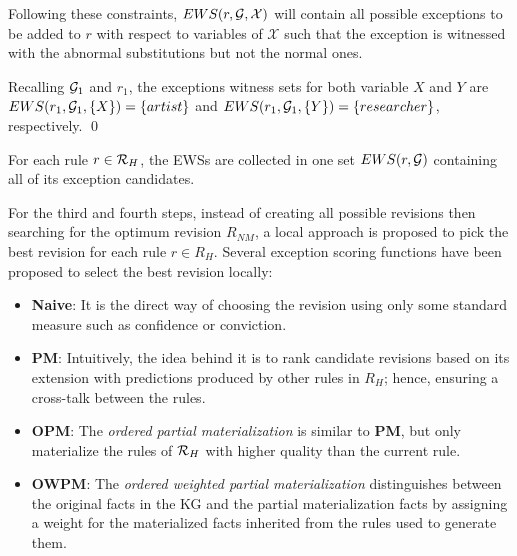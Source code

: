 Following these constraints, $EWS(r,\mathcal{G},\mathcal{X})$ will contain all possible exceptions to be added to $r$ with respect to variables of $\mathcal{X}$ such that the exception is witnessed with the abnormal substitutions but not the normal ones.


\begin{example}
Recalling $\mathcal{G}_1$ and $r_1$, the exceptions witness sets for both variable $X$ and $Y$ are $EWS(r_1,\mathcal{G}_1,\{X\}) = \{artist\}$ and $EWS(r_1,\mathcal{G}_1,\{Y\}) = \{researcher\}$, respectively.
\qed
\end{example}
For each rule $r \in \mathcal{R}_H$, the EWSs are collected in one set $EWS(r,\mathcal{G})$ containing all of its exception candidates. 

For the third and fourth steps, instead of creating all possible revisions then searching for the optimum revision $R_{NM}$, a local approach is proposed to pick the best revision for each rule $r \in R_H$. Several exception scoring functions have been proposed to select the best revision locally:
\begin{itemize}
\item \textbf{Naive}: It is the direct way of choosing the revision using only some standard measure such as confidence or conviction.
\item \textbf{PM}: Intuitively, the idea behind it is to rank candidate revisions based on its extension with predictions produced by other rules in $R_H$; hence, ensuring a cross-talk between the rules.
\item \textbf{OPM}: The \textit{ordered partial materialization} is similar to \textbf{PM}, but only materialize the rules of $\mathcal{R}_{H}$ with higher quality than the current rule.
\item \textbf{OWPM}: The \textit{ordered weighted partial materialization} distinguishes between the original facts in the KG and the partial materialization facts by assigning a weight for the materialized facts inherited from the rules used to generate them. 
\end{itemize}

 



